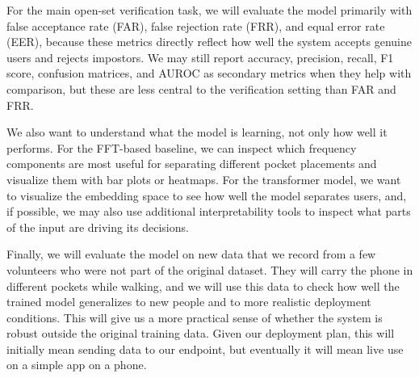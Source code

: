 For the main open-set verification task, we will evaluate the model primarily with false acceptance rate (FAR), false rejection rate (FRR), and equal error rate (EER), because these metrics directly reflect how well the system accepts genuine users and rejects impostors. We may still report accuracy, precision, recall, F1 score, confusion matrices, and AUROC as secondary metrics when they help with comparison, but these are less central to the verification setting than FAR and FRR.

We also want to understand what the model is learning, not only how well it performs. For the FFT-based baseline, we can inspect which frequency components are most useful for separating different pocket placements and visualize them with bar plots or heatmaps. For the transformer model, we want to visualize the embedding space to see how well the model separates users, and, if possible, we may also use additional interpretability tools to inspect what parts of the input are driving its decisions.

\newpage
Finally, we will evaluate the model on new data that we record from a few volunteers who were not part of the original dataset. They will carry the phone in different pockets while walking, and we will use this data to check how well the trained model generalizes to new people and to more realistic deployment conditions. This will give us a more practical sense of whether the system is robust outside the original training data. Given our deployment plan, this will initially mean sending data to our endpoint, but eventually it will mean live use on a simple app on a phone.